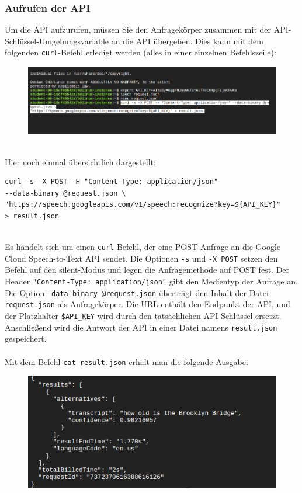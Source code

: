\documentclass[12pt,a4paper]{article}
\begin{document}
\subsubsection{Aufrufen der API}
Um die API aufzurufen, müssen Sie den Anfragekörper zusammen mit der API-Schlüssel-Umgebungsvariable an die API übergeben. Dies kann mit dem folgenden \texttt{curl}-Befehl erledigt werden (alles in einer einzelnen Befehlszeile):

\begin{figure}[h!]
	\centering
	\includegraphics[width=1\linewidth]{../images/curl}
\end{figure}
\ \\
Hier noch einmal übersichtlich dargestellt:
\begin{verbatim}
curl -s -X POST -H "Content-Type: application/json" 
--data-binary @request.json \
"https://speech.googleapis.com/v1/speech:recognize?key=${API_KEY}" 
> result.json
\end{verbatim}
\ \\
Es handelt sich um einen \texttt{curl}-Befehl, der eine POST-Anfrage an die Google Cloud Speech-to-Text API sendet. Die Optionen \texttt{-s} und \texttt{-X POST} setzen den Befehl auf den silent-Modus und legen die Anfragemethode auf POST fest. Der Header \texttt{"Content-Type: application/json"} gibt den Medientyp der Anfrage an. Die Option \texttt{--data-binary @request.json} überträgt den Inhalt der Datei \texttt{request.json} als Anfragekörper. Die URL enthält den Endpunkt der API, und der Platzhalter \texttt{\${API\_KEY}} wird durch den tatsächlichen API-Schlüssel ersetzt. Anschließend wird die Antwort der API in einer Datei namens \texttt{result.json} gespeichert.
\\ \\
Mit dem Befehl \verb|cat result.json| erhält man die folgende Ausgabe:
\newpage
\begin{figure}[h!]
	\centering
	\includegraphics[width=1\linewidth]{../images/ergebnisse}
	\label{fig:ergebnisse}
\end{figure}
\end{document}
